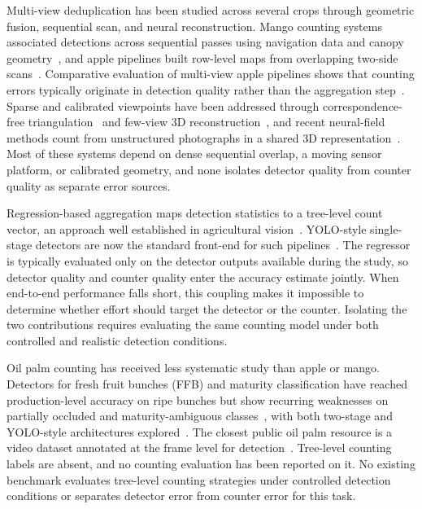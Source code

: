 ﻿\documentclass[conference]{IEEEtran}
\begin{document}
Multi-view deduplication has been studied across several crops through geometric
fusion, sequential scan, and neural reconstruction. Mango counting systems
associated detections across sequential passes using navigation data and canopy
geometry~\cite{ref5}, and apple pipelines built row-level maps from overlapping
two-side scans~\cite{ref6}. Comparative evaluation of multi-view apple pipelines
shows that counting errors typically originate in detection quality rather than
the aggregation step~\cite{ref7}. Sparse and calibrated viewpoints have been
addressed through correspondence-free triangulation~\cite{ref3} and few-view 3D
reconstruction~\cite{ref4}, and recent neural-field methods count from
unstructured photographs in a shared 3D representation~\cite{ref8}. Most of
these systems depend on dense sequential overlap, a moving sensor platform, or
calibrated geometry, and none isolates detector quality from counter quality as
separate error sources.

Regression-based aggregation maps detection statistics to a tree-level count
vector, an approach well established in agricultural
vision~\cite{ref1,ref6,ref7}. YOLO-style single-stage detectors are now the
standard front-end for such pipelines~\cite{ref14,ref15}. The regressor is
typically evaluated only on the detector outputs available during the study,
so detector quality and counter quality enter the accuracy estimate jointly.
When end-to-end performance falls short, this coupling makes it impossible to
determine whether effort should target the detector or the counter. Isolating
the two contributions requires evaluating the same counting model under both
controlled and realistic detection conditions.

Oil palm counting has received less systematic study than apple or mango.
Detectors for fresh fruit bunches (FFB) and maturity classification have
reached production-level accuracy on ripe bunches but show recurring weaknesses
on partially occluded and maturity-ambiguous classes~\cite{refNaftali2024},
with both two-stage and YOLO-style architectures explored~\cite{ref9,ref10,ref11,ref13}. The closest public oil palm resource is a video dataset annotated at the frame level for
detection~\cite{refSuharjito2025}. Tree-level counting labels are absent, and
no counting evaluation has been reported on it. No existing benchmark evaluates
tree-level counting strategies under controlled detection conditions or separates
detector error from counter error for this task.
\end{document}
